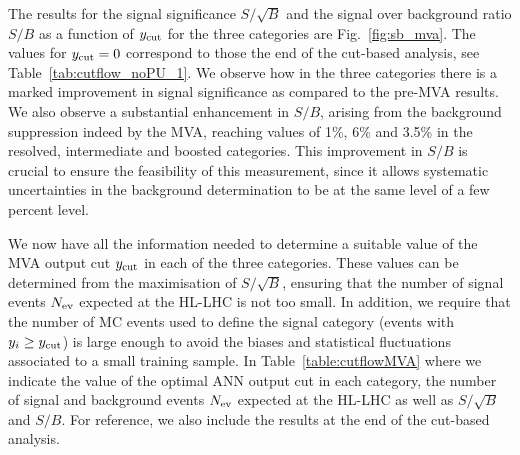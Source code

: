 The results for the signal significance $S/\sqrt{B}$ and
the signal over background ratio
$S/B$ as a function of $y_{\rm cut}$
for the three categories are
Fig.~\ref{fig:sb_mva}.
%
The values 
for $y_{\rm cut}=0$ correspond to those
the end of the cut-based analysis, see
Table~\ref{tab:cutflow_noPU_1}.
%
We observe how in the three
 categories there is a marked  improvement in signal
significance as compared to the pre-MVA results.
%
We also observe a substantial enhancement in $S/B$, arising
from the background suppression indeed by the MVA, reaching
values of 1\%, 6\% and 3.5\% in the resolved,
intermediate and boosted categories.
%
This improvement in $S/B$ is crucial to ensure the feasibility
of this measurement, since it allows systematic
uncertainties in the background determination to
be at the same level of a few percent level.

We now have all the
information needed to determine a suitable
value of the MVA output cut $y_{\rm cut}$ in each
of the three categories.
%
These values can be determined from the maximisation of $S/\sqrt{B}$,
ensuring that the number of signal events $N_{\rm ev}$
expected at the HL-LHC is not too small.
%
In  addition, we require
that the number of MC events used to define the signal
category (events with $y_i \ge y_{\rm cut}$)
is large enough to avoid the biases and statistical
fluctuations associated to a small training sample.
%
In Table~\ref{table:cutflowMVA} where we indicate
the value of the optimal ANN output
cut in each category,
the number of signal and background events $N_{\rm ev}$ expected
at the HL-LHC as well as $S/\sqrt{B}$ and $S/B$.
%
For reference, we also include the results at the end of
the cut-based
analysis.
%


